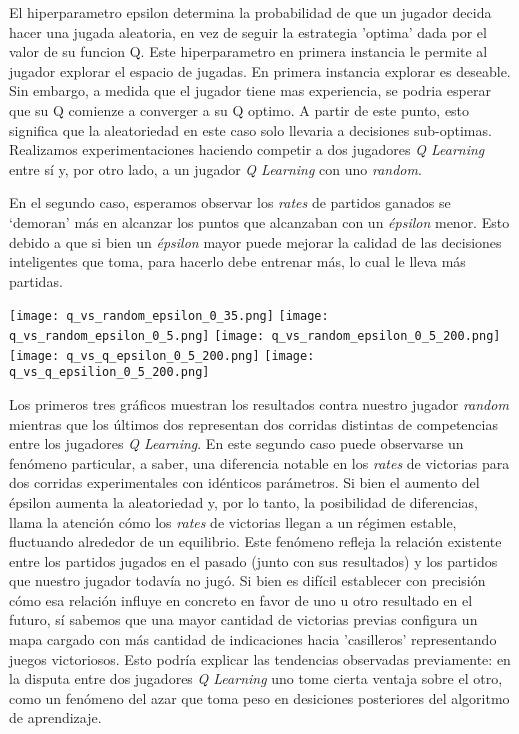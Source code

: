 \documentclass[10pt,a4paper]{article}
\begin{document}
El hiperparametro epsilon determina la probabilidad de que un jugador decida hacer una jugada aleatoria, en vez de seguir la estrategia 'optima' dada por el valor de su funcion Q. Este hiperparametro en primera instancia le permite al jugador explorar el espacio de jugadas. En primera instancia explorar es deseable. Sin embargo, a medida que el jugador tiene mas experiencia, se podria esperar que su Q comienze a converger a su Q optimo. A partir de este punto, esto significa que  la aleatoriedad en este caso solo llevaria a decisiones sub-optimas. Realizamos experimentaciones haciendo competir a dos jugadores \textit{Q Learning} entre sí y, por otro lado, a un jugador \textit{Q Learning} con uno \textit{random}.

En el segundo caso, esperamos observar los \textit{rates} de partidos ganados se `demoran' más en alcanzar los puntos que alcanzaban con un \textit{épsilon} menor. Esto debido a que si bien un \textit{épsilon} mayor puede mejorar la calidad de las decisiones inteligentes que toma, para hacerlo debe entrenar más, lo cual le lleva más partidas.

\texttt{[image: q\_vs\_random\_epsilon\_0\_35.png]}
\texttt{[image: q\_vs\_random\_epsilon\_0\_5.png]}
\texttt{[image: q\_vs\_random\_epsilon\_0\_5\_200.png]}
\\
\texttt{[image: q\_vs\_q\_epsilon\_0\_5\_200.png]}
\texttt{[image: q\_vs\_q\_epsilion\_0\_5\_200.png]}

Los primeros tres gráficos muestran los resultados contra nuestro jugador \textit{random} mientras que los últimos dos representan dos corridas distintas de competencias entre los jugadores \textit{Q Learning}. En este segundo caso puede observarse un fenómeno particular, a saber, una diferencia notable en los \textit{rates} de victorias para dos corridas experimentales con idénticos parámetros. Si bien el aumento del épsilon aumenta la aleatoriedad y, por lo tanto, la posibilidad de diferencias, llama la atención cómo los \textit{rates} de victorias llegan a un régimen estable, fluctuando alrededor de un equilibrio. Este fenómeno refleja la relación existente entre los partidos jugados en el pasado (junto con sus resultados) y los partidos que nuestro jugador todavía no jugó. Si bien es difícil establecer con precisión cómo esa relación influye en concreto en favor de uno u otro resultado en el futuro, sí sabemos que una mayor cantidad de victorias previas configura un mapa cargado con más cantidad de indicaciones hacia 'casilleros' representando juegos victoriosos. Esto podría explicar las tendencias observadas previamente: en la disputa entre dos jugadores \textit{Q Learning} uno tome cierta ventaja sobre el otro, como un fenómeno del azar que toma peso en desiciones posteriores del algoritmo de aprendizaje.
\end{document}
